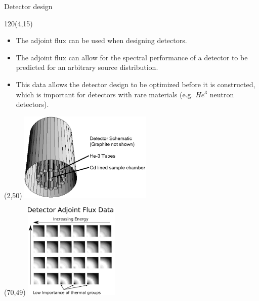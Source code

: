 \documentclass{beamer}
\begin{document}
\begin{frame}{Detector design}
  
  \begin{textblock}{120}(4,15)
    \begin{itemize}
      \item The adjoint flux can be used when designing detectors.
      \item The adjoint flux can allow for the spectral performance of a 
        detector to be predicted for an arbitrary source distribution.
      \item This data allows the detector design to be optimized before it is
        constructed, which is important for detectors with rare materials 
        (e.g. $He^3$ neutron detectors).
    \end{itemize}
  \end{textblock}

  \begin{textblock}{20}(2,50)
    \includegraphics[width=2.5in]{figures/He3_detector.png}
  \end{textblock}

  \begin{textblock}{20}(70,49)
    \includegraphics[width=1.8in]{figures/He3_detector_adjoint_data_modified.pdf}
  \end{textblock}

\end{frame}

\end{document}
